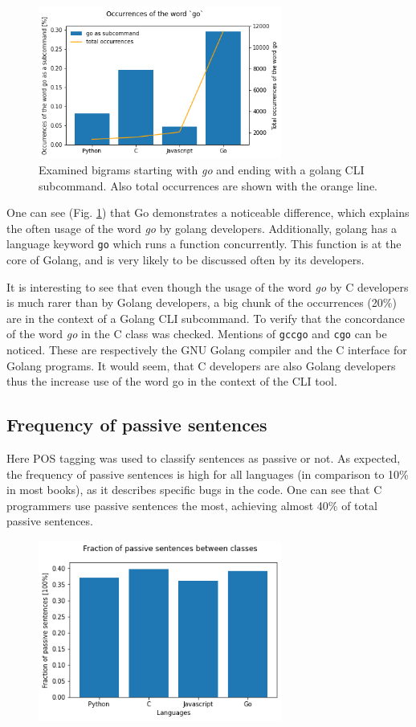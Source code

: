 \documentclass[]{article}
\begin{document}
\begin{figure}[H]
    \centering
    \includegraphics[width=8cm]{go_occ.png}
    \caption{Examined bigrams starting with \emph{go} and ending with a golang CLI subcommand. Also total occurrences are shown with the orange line.}
    \label{fig:go-occ}
\end{figure}

One can see (Fig. \ref{fig:go-occ}) that Go demonstrates a noticeable difference, which explains the often usage of the word \emph{go} by golang developers. Additionally, golang has a language keyword \texttt{go} which runs a function concurrently. This function is at the core of Golang, and is very likely to be discussed often by its developers.

It is interesting to see that even though the usage of the word \emph{go} by C developers is much rarer than by Golang developers, a big chunk of the occurrences (20\%) are in the context of a Golang CLI subcommand. To verify that the concordance of the word \emph{go} in the C class was checked. Mentions of \texttt{gccgo} and \texttt{cgo} can be noticed. These are respectively the GNU Golang compiler and the C interface for Golang programs. It would seem, that C developers are also Golang developers thus the increase use of the word go in the context of the CLI tool.

\subsection{Frequency of passive sentences}

Here POS tagging was used to classify sentences as passive or not. As expected, the frequency of passive sentences is high for all languages (in comparison to 10\% in most books), as it describes specific bugs in the code. One can see that C programmers use passive sentences the most, achieving almost 40\% of total passive sentences.

\begin{figure}[H]
    \includegraphics[width=8cm]{passives.png}
    \centering
\end{figure}
\end{document}
